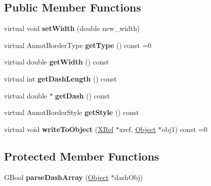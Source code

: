 \subsection*{Public Member Functions}
\begin{DoxyCompactItemize}
\item 
\mbox{\label{class_annot_border_a96667d2d42a736ae52eb3b26972fc5e1}} 
virtual void {\bfseries set\+Width} (double new\+\_\+width)
\item 
\mbox{\label{class_annot_border_a4979e27565e7055f9690fc3c1f1b1301}} 
virtual Annot\+Border\+Type {\bfseries get\+Type} () const =0
\item 
\mbox{\label{class_annot_border_a6ab9e1725cefee1d7e03460def574abb}} 
virtual double {\bfseries get\+Width} () const
\item 
\mbox{\label{class_annot_border_a52d7287566f906a78fb8558c130c516a}} 
virtual int {\bfseries get\+Dash\+Length} () const
\item 
\mbox{\label{class_annot_border_a03359686ff416cb9a810828ee8cfb900}} 
virtual double $\ast$ {\bfseries get\+Dash} () const
\item 
\mbox{\label{class_annot_border_a49609ac667d5d3af7dffb9c97d43d2ea}} 
virtual Annot\+Border\+Style {\bfseries get\+Style} () const
\item 
\mbox{\label{class_annot_border_af2b1e59cfc703d9a486827038931260d}} 
virtual void {\bfseries write\+To\+Object} (\hyperlink{class_x_ref}{X\+Ref} $\ast$xref, \hyperlink{class_object}{Object} $\ast$obj1) const =0
\end{DoxyCompactItemize}
\subsection*{Protected Member Functions}
\begin{DoxyCompactItemize}
\item 
\mbox{\label{class_annot_border_a4c61f9ad77e824eda748d8a9bf64d0f3}} 
G\+Bool {\bfseries parse\+Dash\+Array} (\hyperlink{class_object}{Object} $\ast$dash\+Obj)
\end{DoxyCompactItemize}
